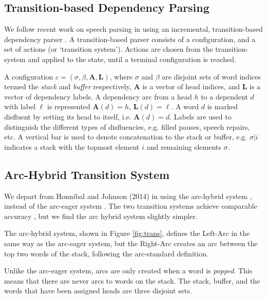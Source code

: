 \documentclass[11pt,letterpaper]{article}
\begin{document}
\subsection{Transition-based Dependency Parsing}

We follow recent work on speech parsing in using an incremental, transition-based
dependency parser \citep{rasooli:13,honnibal:14}.
A transition-based parser \citep{nivre:03} consists of a configuration,
and a set of actions (or `transition system').  Actions are chosen from the
transition-system and applied to the state, until a terminal configuration is
reached.

A configuration $c = (\sigma, \beta, \mathbf{A}, \mathbf{L})$,
where $\sigma$ and $\beta$ are disjoint sets of word
indices termed the \emph{stack} and \emph{buffer} respectively, $\mathbf{A}$ is a
vector of head indices, and $\mathbf{L}$ is a vector of dependency labels.  A
dependency arc from a head $h$ to a dependent $d$ with label $\ell$ is represented
$\mathbf{A}(d)=h$, $\mathbf{L}(d)=\ell$.  A word $d$ is marked disfluent by setting
its head to itself, i.e. $\mathbf{A}(d)=d$.  Labels are used to distinguish the
different types of disfluencies, e.g. filled pauses, speech repairs, etc.
A vertical bar is used to denote concatenation
to the stack or buffer, e.g. $\sigma | i$ indicates a stack with the topmost
element $i$ and remaining elements $\sigma$.

\subsection{Arc-Hybrid Transition System}

We depart from Honnibal and Johnson (2014) in using the arc-hybrid system \citep{kuhlmann:11},
instead of the arc-eager system \citep{nivre:03}. The two transition systems achieve
comparable accuracy \citep{goldberg:13}, but we find the arc hybrid system slightly
simpler.

The arc-hybrid system, shown in Figure \ref{fig:trans}, defines the Left-Arc in
the same way as the \citet{nivre:03}
arc-eager system, but the Right-Arc creates an arc between the top two words of
the stack, following the arc-standard definition.

Unlike the arc-eager system,
arcs are only created when a word is \emph{popped}.
This means that there are never arcs to words on the stack.
The stack, buffer, and the words that have been assigned heads are three disjoint
sets.
\end{document}
